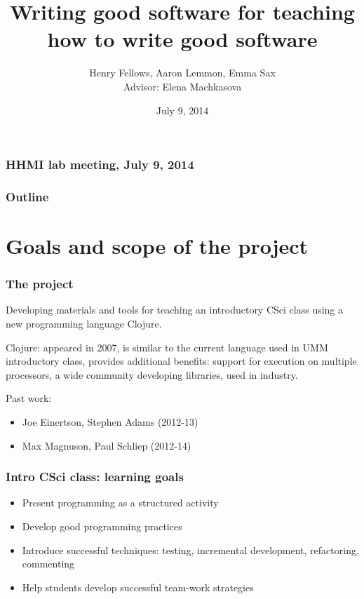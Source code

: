 \documentclass{beamer}
\begin{document}
\author[Henry Fellows, Aaron Lemmon, Emma Sax]
{Henry Fellows, Aaron Lemmon, Emma Sax
\\ Advisor: Elena Machkasova}
\title{Writing good software for teaching how to write good software}
\date{July 9, 2014}

\begin{frame}
\frametitle{HHMI lab meeting, July 9, 2014}

\maketitle

\end{frame}

\begin{frame}[fragile]
\frametitle{Outline}
	\tableofcontents
\end{frame}


\section{Goals and scope of the project}

\begin{frame}[fragile]
\frametitle{The project}
Developing materials and tools for teaching an introductory CSci class using a new programming language Clojure.

Clojure: appeared in 2007, is similar to the current language used in UMM introductory class, provides additional benefits:
support for execution on multiple processors, a wide community developing libraries, used in industry.

Past work: 
\begin{itemize}
\item Joe Einertson, Stephen Adams (2012-13)
\item  Max Magnuson, Paul Schliep (2012-14)
\end{itemize}  
\end{frame}

\begin{frame}[fragile]
\frametitle{Intro CSci class: learning goals}
\begin{itemize}
\item Present programming as a structured activity
\item Develop good programming practices
\item Introduce successful techniques: testing, incremental development, refactoring, commenting 
\item Help students develop successful team-work strategies
\end{itemize}
\end{frame}
\end{document}
